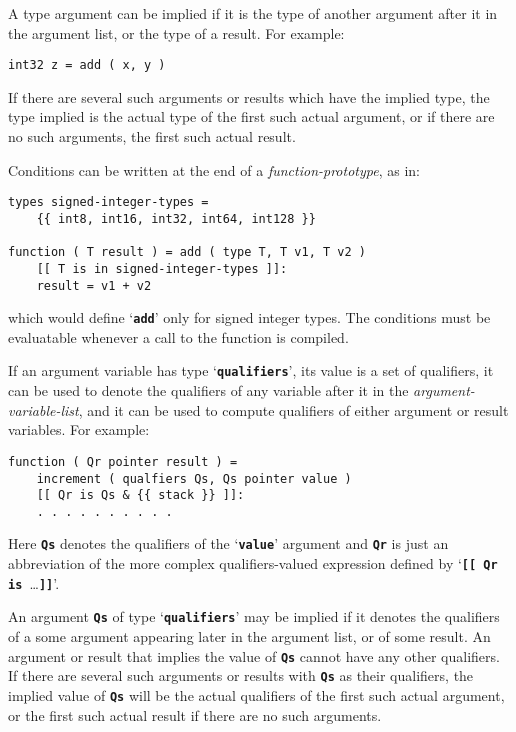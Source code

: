 \documentclass[12pt]{article}
\newcommand{\TT}[1]{{\tt \bfseries #1}}
\newenvironment{indpar}[1][0.3in]%
	{\begin{list}{}%
		     {\setlength{\itemsep}{0in}%
		      \setlength{\topsep}{0in}%
		      \setlength{\parsep}{1ex}%
		      \setlength{\labelwidth}{#1}%
		      \setlength{\leftmargin}{#1}%
		      \addtolength{\leftmargin}{\labelsep}}%
	 \item}%
	{\end{list}}
\begin{document}
A type argument can be implied if it is the type of another argument
after it in the argument list, or the type of a result.  For example:

\begin{indpar}\begin{verbatim}
int32 z = add ( x, y )
\end{verbatim}\end{indpar}

If there are several such arguments or results which have the implied
type, the type implied is the actual type of the first such actual argument,
or if there are no such arguments, the first such actual result.

Conditions can be written at the end of a {\em function-prototype},
as in:
\begin{indpar}\begin{verbatim}
types signed-integer-types =
    {{ int8, int16, int32, int64, int128 }}

function ( T result ) = add ( type T, T v1, T v2 )
    [[ T is in signed-integer-types ]]:
    result = v1 + v2
\end{verbatim}\end{indpar}

which would define `\TT{add}' only for signed integer types.
The conditions must be evaluatable whenever a call to the
function is compiled.

If an argument variable has type `\TT{qualifiers}',
its value is a set of qualifiers,
it can be used to denote the qualifiers of any variable
after it in the {\em argument-variable-list}, and it can be
used to compute qualifiers of either argument or result variables.
For example:
\begin{indpar}\begin{verbatim}
function ( Qr pointer result ) =
    increment ( qualfiers Qs, Qs pointer value )
    [[ Qr is Qs & {{ stack }} ]]:
    . . . . . . . . . .
\end{verbatim}\end{indpar}

Here \TT{Qs} denotes the qualifiers of the `\TT{value}' argument
and \TT{Qr} is just an abbreviation of the more complex
qualifiers-valued expression defined by `\TT{[[ Qr is~}\ldots\TT{]]}'.

An argument \TT{Qs} of type `\TT{qualifiers}' may be implied if it
denotes the qualifiers of a some argument appearing later in the
argument list, or of some result.
An argument or result that implies the value of \TT{Qs}
cannot have any other qualifiers.  If there are several such
arguments or results with \TT{Qs} as their qualifiers,
the implied value of \TT{Qs} will be the actual qualifiers of the
first such actual argument, or the first such actual result if
there are no such arguments.
\end{document}
